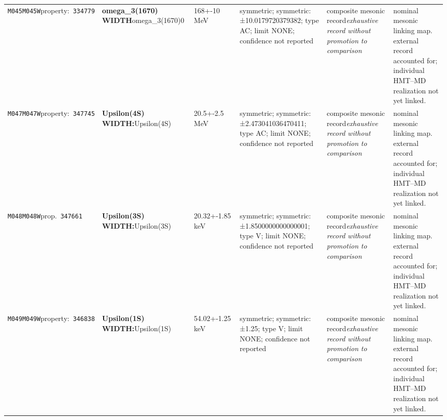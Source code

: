 \begin{landscape}
\begin{longtable}{L{1.85cm}L{4.45cm}L{2.35cm}L{4.05cm}L{3.35cm}L{7.15cm}}
\texttt{M045}\newline \texttt{M045W}\newline property:\ \texttt{334779} & \textbf{omega\_\allowbreak{}3(1670) WIDTH}\newline omega\_\allowbreak{}3(1670)0 & 168+-10\,MeV & symmetric; symmetric: ±10.0179720379382; type AC; limit NONE; confidence not reported & composite mesonic record\newline \emph{exhaustive record without promotion to comparison} & nominal mesonic linking map. external record accounted for; individual HMT--MD realization not yet linked. \\
\texttt{M047}\newline \texttt{M047W}\newline property:\ \texttt{347745} & \textbf{Upsilon(4S) WIDTH:}\newline Upsilon(4S) & 20.5+-2.5\,MeV & symmetric; symmetric: ±2.473041036470411; type AC; limit NONE; confidence not reported & composite mesonic record\newline \emph{exhaustive record without promotion to comparison} & nominal mesonic linking map. external record accounted for; individual HMT--MD realization not yet linked. \\
\texttt{M048}\newline \texttt{M048W}\newline prop.\ \texttt{347661} & \textbf{Upsilon(3S) WIDTH:}\newline Upsilon(3S) & 20.32+-1.85\,keV & symmetric; symmetric: ±1.8500000000000001; type V; limit NONE; confidence not reported & composite mesonic record\newline \emph{exhaustive record without promotion to comparison} & nominal mesonic linking map. external record accounted for; individual HMT--MD realization not yet linked. \\
\texttt{M049}\newline \texttt{M049W}\newline property:\ \texttt{346838} & \textbf{Upsilon(1S) WIDTH:}\newline Upsilon(1S) & 54.02+-1.25\,keV & symmetric; symmetric: ±1.25; type V; limit NONE; confidence not reported & composite mesonic record\newline \emph{exhaustive record without promotion to comparison} & nominal mesonic linking map. external record accounted for; individual HMT--MD realization not yet linked. \\

\end{longtable}
\end{landscape}

